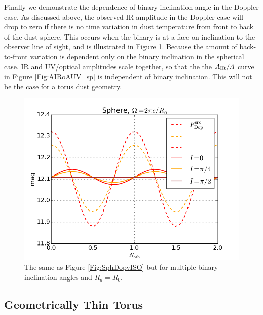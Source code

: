 Finally we demonstrate the dependence of binary inclination angle in the
Doppler case. As discussed above, the observed IR amplitude in the Doppler
case will drop to zero if there is no time variation in dust temperature from
front to back of the dust sphere. This occurs when the binary is at a face-on
inclination to the observer line of sight, and is illustrated in Figure
\ref{Fig:Sph_VarI}. Because the amount of back-to-front variation is dependent
only on the binary inclination in the spherical case, IR and UV/optical
amplitudes scale together, so that the the $A_{\rm IR}/A$ curve in Figure
\ref{Fig:AIRoAUV_sp} is independent of binary inclination. This will not be
the case for a torus dust geometry.

\begin{figure}
\begin{center}
\includegraphics[scale=0.33]{figures/ch5/Sphere/FDop_Sphere_nrm2p13871_Rde2p73218e+18_VaryInc_numin0_numx10} 
\end{center}
\caption{The same as Figure \ref{Fig:SphDopvISO} but for multiple binary inclination angles and $R_d = R_0$.}
\label{Fig:Sph_VarI}
\end{figure}






 
\subsection{Geometrically Thin Torus} 
\label{S:Interp:ThinTor}

